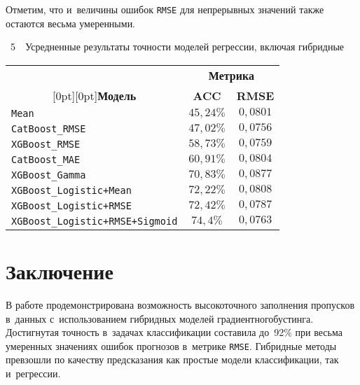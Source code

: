 \begin{multicols}{2}
Отметим, что и~величины ошибок \verb"RMSE" для непрерывных 
значений также остаются весьма умеренными.

\vspace*{6pt}


\noindent
{{\tablename~5}\ \ \small{Усредненные результаты точности моделей 
регрессии, включая гибридные}}

{\small
\begin{center}
\begin{tabular}{|l|c|c|}
\hline
& \multicolumn{2}{c|}{\bf Метрика}\\
\cline{2-3}
\multicolumn{1}{|c|}{{\raisebox{6pt}[0pt][0pt]{{\bf Модель}}}} 
 & {\bf ACC}& {\bf RMSE}\\
\hline
\verb"Mean"  &  $45{,}24\%$ &  $0{,}0801$ \\
\verb"CatBoost_RMSE"                 &  $47{,}02\%$ &  $0{,}0756$ \\
\verb"XGBoost_RMSE"                  &  $58{,}73\%$ &  $0{,}0759$ \\
\verb"CatBoost_MAE"                  &  $60{,}91\%$ &  $0{,}0804$ \\
\verb"XGBoost_Gamma"                 &  $70{,}83\%$ &  $0{,}0877$ \\
\verb"XGBoost_Logistic+Mean"         &  $72{,}22\%$ &  $0{,}0808$ \\
\verb"XGBoost_Logistic+RMSE"         &  $72{,}42\%$ &  $0{,}0787$ \\
\verb"XGBoost_Logistic+RMSE+Sigmoid" &  $74{,}4\%$\hphantom{9} &  $0{,}0763$ \\
\hline
\end{tabular}
\end{center}
}

\section{Заключение}

В работе продемонстрирована возможность высокоточного заполнения 
пропусков в~данных с~использованием гибридных моделей градиентного\linebreak бустинга. 
Достигнутая точность в~задачах классификации составила до~92\% 
при весьма умеренных значениях ошибок прогнозов в~метрике \verb"RMSE". 
Гибридные методы превзошли по качеству предсказания как простые модели 
классификации, так и~регрессии.


\end{multicols}
